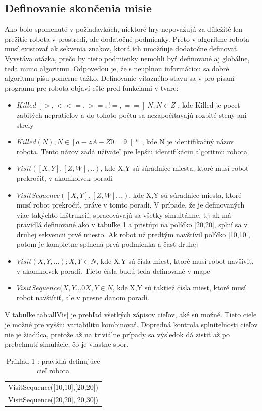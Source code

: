 \subsection{ Definovanie skončenia misie }
Ako bolo spomenuté v požiadavkách, niektoré hry nepovažujú za důležité len prežitie robota v prostredí, ale dodatočné podmienky. Preto v algoritme robota musí existovať ak sekvenia znakov, ktorá ich umožňuje dodatočne definovať. Vyvstáva otázka, prečo by tieto podmienky nemohli byť definované aj globálne, teda mimo algoritmu. Odpoveďou je, že s neuplnou informáciou sa dobré algoritmu píšu pomerne ťažko.%
Definovanie vítazného stavu sa v pro písaní programu pre robota objaví ešte pred funkciami v tvare:
\begin{itemize}
\item $Killed\ [>, < <=, >=, !=, ==]\ N, N \in Z$ , kde Killed je pocet zabitých nepratieľov a do tohoto počtu sa nezapočítavajú rozbité steny ani strely
\item $Killed( N ), N \in [a-zA-Z0=9\_]*$ , kde N je identifikačný názov robota. Tento názov zadá užívateľ pre lepšiu identifikáciu algoritmu robota
\item $Visit([X,Y], [Z,W],..)$, kde X,Y sú súradnice miesta, ktoré musí robot prekročiť, v akomkoľvek poradi
\item $VisitSequence([X,Y], [Z,W],..)$, kde X,Y sú súradnice miesta, ktoré musí robot prekročiť, práve v tomto poradi. V prípade, že je definovaných viac takýchto inštrukcií, spracovávajú sa všetky simultánne, t.j ak má pravidlá definované ako v tabuľke \ref{tab:pr1} a pristúpi na políčko [20,20], splní sa v druhej sekvencii prvé miesto. Ak robot už predtým navštívil políčko [10,10], potom je kompletne splnená prvá podmienka a časť druhej
\item $Visit(X, Y,...); X,Y \in N $, kde X,Y sú čísla miest, ktoré musí robot navšíviť, v akomkoľvek poradí. Tieto čísla budú teda definované v mape
\item $VisitSequence(X,Y...0 X,Y \in N$, kde X,Y sú taktiež čísla miest, ktoré musí robot navštítiť, ale v presne danom poradí.
\end{itemize}
V tabuľke\ref{tab:allVis} je prehľad všetkých zápisov cieľov, aké sú možné. Tieto ciele je možné pre vyššiu variabilitu kombinovať. Dopredná kontrola splniteľnosti cieľov nie je žiadúca, pretože až na triviálne prípady sa výsledok dá zistiť až po prebehnutí simulácie, čo je vlastne spor.
\begin{table}
\centering
\begin{tabular}{l}
VisitSequence([10,10],[20,20])\\
VisitSequence([20,20],[20,30])\\
\end{tabular}
\caption {Príklad 1 : pravidlá definujúce cieľ robota} %
\label{tab:pr1}
\end{table}

